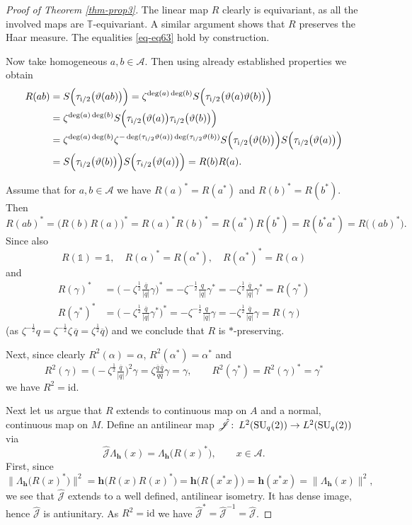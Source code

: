 \documentclass[12pt,reqno,a4paper]{amsart}
\theoremstyle{definition}
\newcommand{\I}{\mathds{1}}
\newcommand{\id}{\mathrm{id}}
\newcommand{\ii}{\mathrm{i}}
\newcommand{\TT}{\mathbb{T}}
\newcommand{\cA}{\mathscr{A}}
\newcommand{\bh}{{\boldsymbol{h}}}
\DeclareMathOperator{\Ltwo}{\mathnormal{L}^2}
\newcommand{\SU}{\mathrm{SU}}
\newcommand{\cJhat}{\hat{\mathscr{J}}}
\numberwithin{equation}{section}
\begin{document}
\begin{proof}[Proof of Theorem \ref{thm-prop3}]
The linear map $R$ clearly is equivariant, as all the involved maps are $\TT$-equivariant. A similar argument shows that $R$ preserves the Haar measure. The equalities \eqref{eq-eq63} hold by construction.

Now take homogeneous $a,b\in\cA$. Then using already established properties we obtain
\begin{align*}
R(ab)
&=S\Bigl(\tau_{\ii/2}\bigl(\vartheta(ab)\bigr)\Bigr)
=\zeta^{\deg(a)\deg(b)}S\Bigl(\tau_{\ii/2}\bigl(\vartheta(a)\vartheta(b)\bigr)\Bigr)\\
&=\zeta^{\deg(a)\deg(b)}S\Bigl(\tau_{\ii/2}\bigl(\vartheta(a)\bigr)\tau_{\ii/2}\bigl(\vartheta(b)\bigr)\Bigr)\\
&=\zeta^{\deg(a)\deg(b)}
\zeta^{-\deg(\tau_{\ii/2}\vartheta(a))\deg(\tau_{\ii/2}\vartheta(b))}
S\Bigl(\tau_{\ii/2}\bigl(\vartheta(b)\bigr)\Bigr)
S\Bigl(\tau_{\ii/2}\bigl(\vartheta(a)\bigr)\Bigr)\\
&=S\Bigl(\tau_{\ii/2}\bigl(\vartheta(b)\bigr)\Bigr)
S\Bigl(\tau_{i/2}\bigl(\vartheta(a)\bigr)\Bigr)=R(b)R(a).
\end{align*}

Assume that for $a,b\in\cA$ we have $R(a)^*=R(a^*)$ and $R(b)^*=R(b^*)$. Then
\[
R(ab)^*=\bigl(R(b)R(a)\bigr)^*=R(a)^*R(b)^*=R(a^*)R(b^*)=R(b^* a^*)
=R\bigl((ab)^*\bigr).
\]
Since also
\[
R(\I)=\I,\quad
R(\alpha)^*=R(\alpha^*),\quad
R(\alpha^*)^*=R(\alpha)
\]
and
\begin{align*}
R(\gamma)^*
&=\bigl(-\zeta^{\frac{1}{2}}\tfrac{\overline{q}}{|q|}\gamma\bigr)^*
=-\zeta^{-\frac{1}{2}}\tfrac{ q}{|q|}\gamma^*
=-\zeta^{\frac{1}{2}}\tfrac{\overline{q}}{|q|}\gamma^*
=R(\gamma^*)\\
R(\gamma^*)^*
&=\bigl(-\zeta^{\frac{1}{2}}\tfrac{\overline{q}}{|q|}\gamma^*\bigr)^*
=-\zeta^{-\frac{1}{2}}\tfrac{q}{|q|}\gamma
=-\zeta^{\frac{1}{2}}\tfrac{\overline{q}}{|q|}\gamma
=R(\gamma)
\end{align*}
(as $\zeta^{-\frac{1}{2}}q=\zeta^{-\frac{1}{2}} \zeta\, \overline{q}=\zeta^{\frac{1}{2}}\overline{q}$) and we conclude that $R$ is $*$-preserving.

Next, since clearly $R^2(\alpha)=\alpha$, $R^2(\alpha^*)=\alpha^*$ and
\[
R^2(\gamma)=\bigl(-\zeta^{\frac{1}{2}}\tfrac{\overline{q}}{|q|}\bigr)^2\gamma
=\zeta\tfrac{\overline{q}\,\overline{q}}{q\overline{q}}\gamma=\gamma,\qquad
R^2(\gamma^*)=R^2(\gamma)^*=\gamma^*
\]
we have $R^2=\id$.

Next let us argue that $R$ extends to continuous map on $A$ and a normal, continuous map on $M$. Define
an antilinear map $\cJhat\colon\Ltwo(\SU_q(2))\to\Ltwo(\SU_q(2))$ via
\[
\cJhat\Lambda_\bh(x)=\Lambda_\bh\bigl(R(x)^*\bigr),\qquad x\in\cA.
\]
First, since
\[
\bigl\|\Lambda_\bh\bigl(R(x)^*\bigr)\bigr\|^2
=\bh\bigl(R(x)R(x)^*\bigr)=\bh\bigl(R(x^*x)\bigr)
=\bh(x^*x)=\bigl\|\Lambda_\bh(x)\bigr\|^2,
\]
we see that $\cJhat$ extends to a well defined, antilinear isometry. It has dense image, hence $\cJhat$ is antiunitary. As $R^2=\id$ we have $\cJhat^*=\cJhat^{-1}=\cJhat$.


\end{proof}
\end{document}

